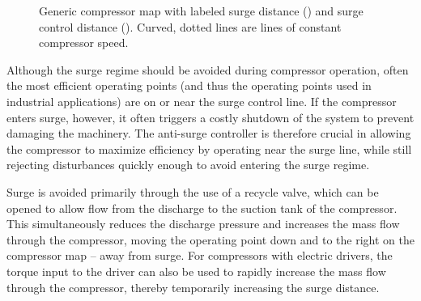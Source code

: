 \begin{figure}
  \centering
  
  \caption[Generic compressor map.]{Generic compressor map with labeled surge distance () and surge control distance (). Curved, dotted lines are lines of constant compressor speed.}
  \label{fig:intro:comp-map}
\end{figure}

Although the surge regime should be avoided during compressor operation, often the most efficient operating points (and thus the operating points used in industrial applications) are on or near the surge control line.
If the compressor enters surge, however, it often triggers a costly shutdown of the system to prevent damaging the machinery.
The anti-surge controller is therefore crucial in allowing the compressor to maximize efficiency by operating near the surge line, while still rejecting disturbances quickly enough to avoid entering the surge regime.

Surge is avoided primarily through the use of a recycle valve, which can be opened to allow flow from the discharge to the suction tank of the compressor.
This simultaneously reduces the discharge pressure and increases the mass flow through the compressor, moving the operating point down and to the right on the compressor map -- away from surge.
For compressors with electric drivers, the torque input to the driver can also be used to rapidly increase the mass flow through the compressor, thereby temporarily increasing the surge distance.


